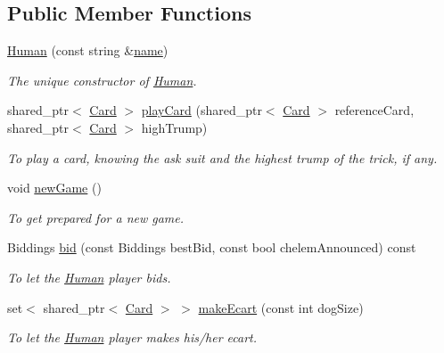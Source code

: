 \subsection*{\-Public \-Member \-Functions}
\begin{DoxyCompactItemize}
\item 
\hyperlink{classHuman_abfd57b90d90f9222384c76b44346ba7b}{\-Human} (const string \&\hyperlink{classPlayer_acf0355128a99ee20ad9931b760fb2de1}{name})
\begin{DoxyCompactList}\small\item\em \-The unique constructor of \hyperlink{classHuman}{\-Human}. \end{DoxyCompactList}\item 
shared\-\_\-ptr$<$ \hyperlink{classCard}{\-Card} $>$ \hyperlink{classHuman_a3258d3ce0eec7a5e393c639506ef28e5}{play\-Card} (shared\-\_\-ptr$<$ \hyperlink{classCard}{\-Card} $>$ reference\-Card, shared\-\_\-ptr$<$ \hyperlink{classCard}{\-Card} $>$ high\-Trump)
\begin{DoxyCompactList}\small\item\em \-To play a card, knowing the ask suit and the highest trump of the trick, if any. \end{DoxyCompactList}\item 
\hypertarget{classHuman_aae5efb6945fdbcda9c9a4d9e72d4a60e}{void \hyperlink{classHuman_aae5efb6945fdbcda9c9a4d9e72d4a60e}{new\-Game} ()}\label{classHuman_aae5efb6945fdbcda9c9a4d9e72d4a60e}

\begin{DoxyCompactList}\small\item\em \-To get prepared for a new game. \end{DoxyCompactList}\item 
\-Biddings \hyperlink{classHuman_a424bc9179b7036f22a694329b5f6fedf}{bid} (const \-Biddings best\-Bid, const bool chelem\-Announced) const 
\begin{DoxyCompactList}\small\item\em \-To let the \hyperlink{classHuman}{\-Human} player bids. \end{DoxyCompactList}\item 
set$<$ shared\-\_\-ptr$<$ \hyperlink{classCard}{\-Card} $>$ $>$ \hyperlink{classHuman_a02cdef89dde0adcb554f081e81f97896}{make\-Ecart} (const int dog\-Size)
\begin{DoxyCompactList}\small\item\em \-To let the \hyperlink{classHuman}{\-Human} player makes his/her ecart. \end{DoxyCompactList}\end{DoxyCompactItemize}


